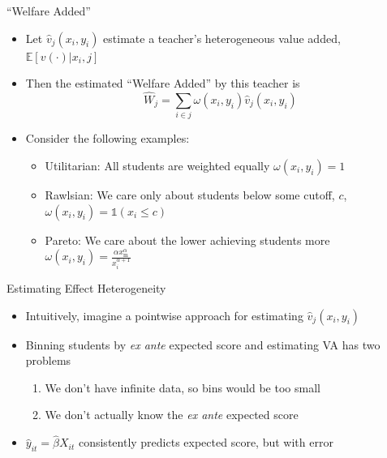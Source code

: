 \documentclass[11pt]{beamer}
\begin{document}
\begin{frame}{``Welfare Added''}

\begin{itemize}
    \item Let $\hat{v}_j(x_i,y_i)$ estimate a teacher's heterogeneous value added, $\mathbb{E}[v(\cdot)|x_i,j]$
    
    \item Then the estimated ``Welfare Added'' by this teacher is  
    \[
    \hat{W}_j  = \sum_{i\in j} \omega(x_i,y_i) \hat{v}_j(x_i,y_i) 
    \] 
    
    \item Consider the following examples:
    \begin{itemize}
        \item Utilitarian: All students are weighted equally $\omega(x_i,y_i) = 1$
        \item Rawlsian: We care only about students below some cutoff, $c$, $\omega(x_i,y_i) = \mathds{1}(x_i\leq c)$
        \item Pareto: We care about the lower achieving students more $ \omega(x_i,y_i)=  \frac{\alpha x_\mathrm{m}^\alpha}{x_i^{\alpha+1}}$ 
    \end{itemize}
    
\end{itemize}


\end{frame}



\begin{frame}{Estimating Effect Heterogeneity}

\begin{itemize}
    \item Intuitively, imagine a pointwise approach for estimating $\hat{v}_j(x_i,y_i)$
    
    \item Binning students by \textit{ex ante} expected score and estimating VA has two problems
    \begin{enumerate}
        \item We don't have infinite data, so bins would be too small
        \item We don't actually know the \textit{ex ante} expected score
    \end{enumerate}

    \item $\hat{y}_{it} = \hat{\beta} X_{it}$ consistently predicts expected score, but with error

\end{itemize}

\end{frame}
\end{document}
